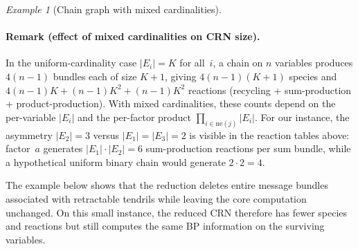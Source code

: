 \documentclass{article}
\theoremstyle{plain}
\theoremstyle{definition}
\theoremstyle{remark}
\newtheorem{example}{Example}[section]
\newcommand{\<}{\langle}
\renewcommand{\>}{\rangle}
\begin{document}
\begin{example}[Chain graph with mixed cardinalities]
\paragraph{Remark (effect of mixed cardinalities on CRN size).}
In the uniform-cardinality case $|E_i|=K$ for all~$i$,
a chain on $n$ variables produces
$4(n{-}1)$ bundles each of size $K{+}1$, giving
$4(n{-}1)(K{+}1)$ species and
$4(n{-}1)K + (n{-}1)K^2 + (n{-}1)K^2$ reactions
(recycling + sum-production + product-production).
With mixed cardinalities, these counts depend on the
per-variable $|E_i|$ and the per-factor product
$\prod_{i\in\mathrm{ne}(j)}|E_i|$.
For our instance, the asymmetry $|E_2|=3$ versus
$|E_1|=|E_3|=2$ is visible in the reaction tables above:
factor~$a$ generates $|E_1|\cdot|E_2|=6$ sum-production
reactions per sum bundle, while a hypothetical uniform
binary chain would generate $2\cdot 2=4$.
\end{example}
The example below shows that the reduction deletes entire message bundles associated with retractable tendrils while leaving the core computation unchanged. On this small instance, the reduced CRN therefore has fewer species and reactions but still computes the same BP information on the surviving variables.
\end{document}
